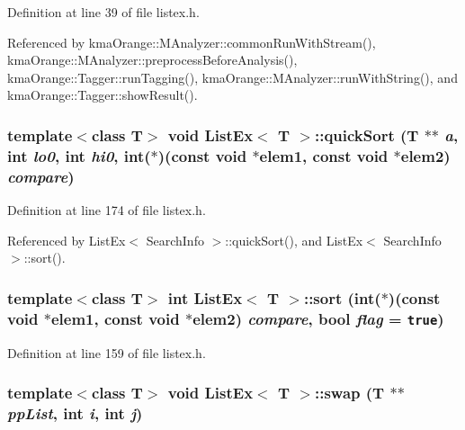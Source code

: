 Definition at line 39 of file listex.h.

Referenced by kmaOrange::MAnalyzer::commonRunWithStream(), kmaOrange::MAnalyzer::preprocessBeforeAnalysis(), kmaOrange::Tagger::runTagging(), kmaOrange::MAnalyzer::runWithString(), and kmaOrange::Tagger::showResult().\hypertarget{classListEx_7d33869802cb48bae239d18a11472e4a}{
\subsubsection[{quickSort}]{\setlength{\rightskip}{0pt plus 5cm}template$<$class T$>$ void {\bf ListEx}$<$ T $>$::quickSort (T $\ast$$\ast$ {\em a}, \/  int {\em lo0}, \/  int {\em hi0}, \/  int($\ast$)(const void $\ast$elem1, const void $\ast$elem2) {\em compare})}}
\label{classListEx_7d33869802cb48bae239d18a11472e4a}




Definition at line 174 of file listex.h.

Referenced by ListEx$<$ SearchInfo $>$::quickSort(), and ListEx$<$ SearchInfo $>$::sort().\hypertarget{classListEx_7db48fe6316ab19995190763195bbf65}{
\subsubsection[{sort}]{\setlength{\rightskip}{0pt plus 5cm}template$<$class T$>$ int {\bf ListEx}$<$ T $>$::sort (int($\ast$)(const void $\ast$elem1, const void $\ast$elem2) {\em compare}, \/  bool {\em flag} = {\tt true})}}
\label{classListEx_7db48fe6316ab19995190763195bbf65}




Definition at line 159 of file listex.h.\hypertarget{classListEx_df32b41c634a42c27aef6b832bedb853}{
\subsubsection[{swap}]{\setlength{\rightskip}{0pt plus 5cm}template$<$class T$>$ void {\bf ListEx}$<$ T $>$::swap (T $\ast$$\ast$ {\em ppList}, \/  int {\em i}, \/  int {\em j})}}
\label{classListEx_df32b41c634a42c27aef6b832bedb853}





